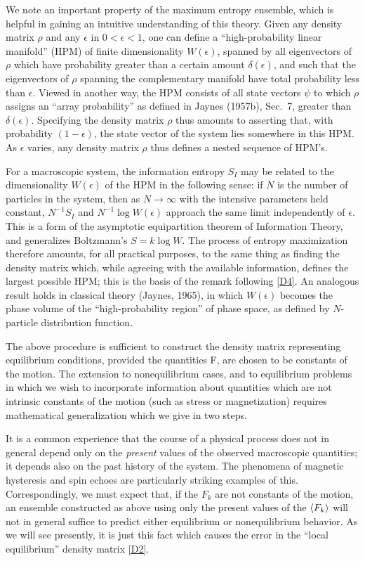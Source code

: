 We note an important property of the maximum entropy ensemble, which is helpful in gaining an intuitive understanding of this theory.
Given any density matrix $\rho$ and any $\epsilon$ in $0 < \epsilon < 1$, one can define a ``high-probability linear manifold'' (HPM) of finite dimensionality $W(\epsilon)$, spanned by all eigenvectors of $\rho$ which have probability greater than a certain amount $\delta(\epsilon)$, and such that the eigenvectors of $\rho$ spanning the complementary manifold have total probability less than $\epsilon$.
Viewed in another way, the HPM consists of all state vectors $\psi$ to which $\rho$ assigns an ``array probability'' as defined in \cite{jaynes57}{Jaynes (1957b)}, Sec.~7, greater than $\delta(\epsilon)$.
Specifying the density matrix $\rho$ thus amounts to asserting that, with probability $(1-\epsilon)$, the state vector of the system lies somewhere in this HPM.
As $\epsilon$ varies, any density matrix $\rho$ thus defines a nested sequence of HPM's.

For a macroscopic system, the information entropy $S_I$ may be related to the dimensionality $W(\epsilon)$ of the HPM in the following sense: if $N$ is the number of particles in the system, then as $N \to \infty$ with the intensive parameters held constant, $N^{-1} S_I$ and $N^{-1} \log W(\epsilon)$ approach the same limit independently of $\epsilon$.
This is a form of the asymptotic equipartition theorem of Information Theory, and generalizes Boltzmann's $S = k \log W$.
The process of entropy maximization therefore amounts, for all practical purposes, to the same thing as finding the density matrix which, while agreeing with the available information, defines the largest possible HPM; this is the basis of the remark following \eqref{D4}.
An analogous result holds in classical theory (\cite{jaynes65}{Jaynes, 1965}), in which $W(\epsilon)$ becomes the phase volume of the ``high-probability region'' of phase space, as defined by $N$-particle distribution function.

The above procedure is sufficient to construct the density matrix representing equilibrium conditions, provided the quantities F, are chosen to be constants of the motion.
The extension to nonequilibrium cases, and to equilibrium problems in which we wish to incorporate information about quantities which are not intrinsic constants of the motion (such as stress or magnetization) requires mathematical generalization which we give in two steps.

It is a common experience that the course of a physical process does not in general depend only on the \emph{present} values of the observed macroscopic quantities; it depends also on the
past history of the system.
The phenomena of magnetic hysteresis and spin echoes are particularly striking examples of this.
Correspondingly, we must expect that, if the $F_k$ are not constants of the motion, an ensemble constructed as above using only the present values of the $\langle F_k\rangle$ will not in general suffice to predict either equilibrium or nonequilibrium behavior.
As we will see presently, it is just this fact which causes the error in the ``local equilibrium'' density matrix \eqref{D2}.


